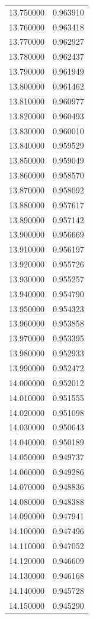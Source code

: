 \begin{tabular}{rr}
13.750000 & 0.963910 \\
13.760000 & 0.963418 \\
13.770000 & 0.962927 \\
13.780000 & 0.962437 \\
13.790000 & 0.961949 \\
13.800000 & 0.961462 \\
13.810000 & 0.960977 \\
13.820000 & 0.960493 \\
13.830000 & 0.960010 \\
13.840000 & 0.959529 \\
13.850000 & 0.959049 \\
13.860000 & 0.958570 \\
13.870000 & 0.958092 \\
13.880000 & 0.957617 \\
13.890000 & 0.957142 \\
13.900000 & 0.956669 \\
13.910000 & 0.956197 \\
13.920000 & 0.955726 \\
13.930000 & 0.955257 \\
13.940000 & 0.954790 \\
13.950000 & 0.954323 \\
13.960000 & 0.953858 \\
13.970000 & 0.953395 \\
13.980000 & 0.952933 \\
13.990000 & 0.952472 \\
14.000000 & 0.952012 \\
14.010000 & 0.951555 \\
14.020000 & 0.951098 \\
14.030000 & 0.950643 \\
14.040000 & 0.950189 \\
14.050000 & 0.949737 \\
14.060000 & 0.949286 \\
14.070000 & 0.948836 \\
14.080000 & 0.948388 \\
14.090000 & 0.947941 \\
14.100000 & 0.947496 \\
14.110000 & 0.947052 \\
14.120000 & 0.946609 \\
14.130000 & 0.946168 \\
14.140000 & 0.945728 \\
14.150000 & 0.945290 \\

\end{tabular}
